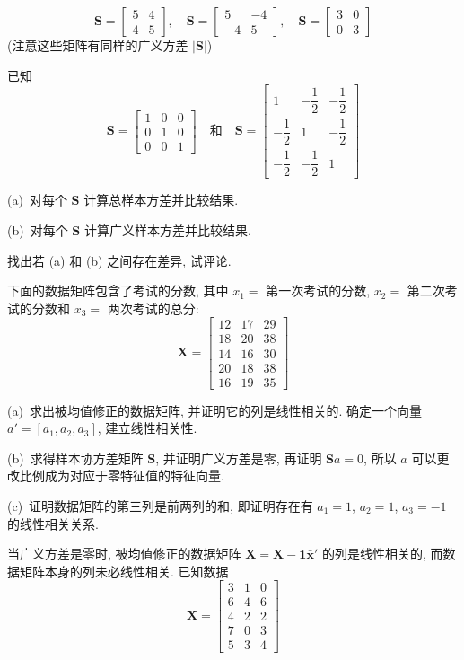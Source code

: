 \[
\mathbf{S}=\begin{bmatrix}5&4\\4&5\end{bmatrix},\quad
\mathbf{S}=\begin{bmatrix}5&-4\\-4&5\end{bmatrix},\quad
\mathbf{S}=\begin{bmatrix}3&0\\0&3\end{bmatrix}
\]
(注意这些矩阵有同样的广义方差 $|\mathbf{S}|$)

\quad 已知
\[
\mathbf{S}=\begin{bmatrix}1&0&0\\0&1&0\\0&0&1\end{bmatrix}
\quad\text{和}\quad
\mathbf{S}=\begin{bmatrix}
1&-\dfrac{1}{2}&-\dfrac{1}{2}\\[2mm]
-\dfrac{1}{2}&1&-\dfrac{1}{2}\\[2mm]
-\dfrac{1}{2}&-\dfrac{1}{2}&1
\end{bmatrix}
\]

(a)\ 对每个 $\mathbf{S}$ 计算总样本方差并比较结果.

(b)\ 对每个 $\mathbf{S}$ 计算广义样本方差并比较结果.

找出若 (a) 和 (b) 之间存在差异, 试评论.

\quad 下面的数据矩阵包含了考试的分数, 其中 $x_1=$ 第一次考试的分数, $x_2=$ 第二次考试的分数和 $x_3=$ 两次考试的总分:
\[
\mathbf{X}=\begin{bmatrix}
12&17&29\\
18&20&38\\
14&16&30\\
20&18&38\\
16&19&35
\end{bmatrix}
\]

(a)\ 求出被均值修正的数据矩阵, 并证明它的列是线性相关的. 确定一个向量 $a'=[a_1,a_2,a_3]$, 建立线性相关性.

(b)\ 求得样本协方差矩阵 $\mathbf{S}$, 并证明广义方差是零, 再证明 $\mathbf{S}a=0$, 所以 $a$ 可以更改比例成为对应于零特征值的特征向量.

(c)\ 证明数据矩阵的第三列是前两列的和, 即证明存在有 $a_1=1$, $a_2=1$, $a_3=-1$ 的线性相关关系.

\quad 当广义方差是零时, 被均值修正的数据矩阵 $\mathbf{X}=\mathbf{X}-\mathbf{1}\bar{\mathbf{x}}'$ 的列是线性相关的, 而数据矩阵本身的列未必线性相关. 已知数据
\[
\mathbf{X}=\begin{bmatrix}
3&1&0\\
6&4&6\\
4&2&2\\
7&0&3\\
5&3&4
\end{bmatrix}
\]


